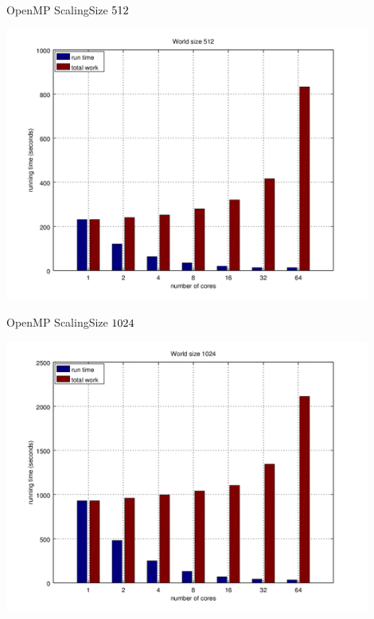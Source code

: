 \documentclass{beamer}
\begin{document}
\begin{frame}{OpenMP Scaling}{Size $512 \time 512$}
    \begin{center}
        \includegraphics[width=0.9\textwidth]{scaling-512}
    \end{center}
\end{frame}

\begin{frame}{OpenMP Scaling}{Size $1024 \time 1024$}
    \begin{center}
        \includegraphics[width=0.9\textwidth]{scaling-1024}
    \end{center}
\end{frame}
\end{document}
